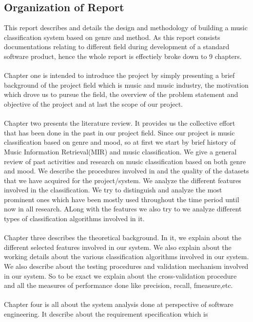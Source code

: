 \subsection{Organization of Report}
This report describes and details the design and methodology of building a music classification system based on genre and method. As this report consists
documentations relating to different field during development of a standard software product, hence the whole report is effectiely broke down to 9 chapters.\\
\\
Chapter one is intended to introduce the project by simply presenting a brief background of the project field which is music and music industry, the motivation which drove 
us to pursue the field, the overview of the problem statement and objective of the project and at last the scope of our project.\\
\\
Chapter two presents the literature review. It provides us the collective effort that has been done in the past in our project field. Since our
project is music classification based on genre and mood, so at first we start by brief history of Music Information Retrieval(MIR) and music classification.
We give a general review of past activities and research on music classification based on both genre and mood. We describe the procedures involved in and
the quality of the datasets that we have acquired for the project/system. We analyze the different features involved in the classification.
We try to distinguish and analyze the most prominent ones which have been mostly used throughout the time period until now in all research. ALong with the features we also try to 
we analyze different types of classification algorithms involved in it.\\
\\
Chapter three describes the theoretical background. In it, we explain about the different selected features involved in our system. We also explain about the working details about the 
various classification algorithms involved in our system. We also describe about the testing procedures and validation mechanism involved in our system. So to be exact
we explain about the cross-validation procedure and all the measures of performance done like precision, recall, fmeasure,etc.\\
\\
Chapter four is all about the system analysis done at perspective of software engineering. It describe about the requirement specification which is
